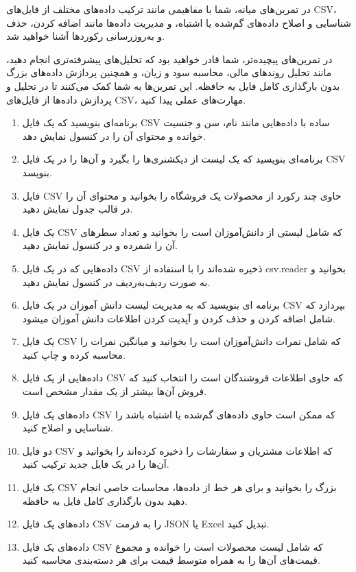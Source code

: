 \documentclass[b5paper,12pt]{article}
\begin{document}
	در تمرین‌های میانه، شما با مفاهیمی مانند ترکیب داده‌های مختلف از فایل‌های CSV، شناسایی و اصلاح داده‌های گم‌شده یا اشتباه، و مدیریت داده‌ها مانند اضافه کردن، حذف و به‌روزرسانی رکوردها آشنا خواهید شد.

	در تمرین‌های پیچیده‌تر، شما قادر خواهید بود که تحلیل‌های پیشرفته‌تری انجام دهید، مانند تحلیل روندهای مالی، محاسبه سود و زیان، و همچنین پردازش داده‌های بزرگ بدون بارگذاری کامل فایل به حافظه. این تمرین‌ها به شما کمک می‌کنند تا در تحلیل و پردازش داده‌ها از فایل‌های CSV، مهارت‌های عملی پیدا کنید.

	\begin{enumerate}
		\item برنامه‌ای بنویسید که یک فایل CSV ساده با داده‌هایی مانند نام، سن و جنسیت خوانده و محتوای آن را در کنسول نمایش دهد.
		\item برنامه‌ای بنویسید که یک لیست از دیکشنری‌ها را بگیرد و آن‌ها را در یک فایل CSV بنویسد.
		\item فایل CSV حاوی چند رکورد از محصولات یک فروشگاه را بخوانید و محتوای آن را در قالب جدول نمایش دهید.
		\item یک فایل CSV که شامل لیستی از دانش‌آموزان است را بخوانید و تعداد سطرهای آن را شمرده و در کنسول نمایش دهید.
		\item داده‌هایی که در یک فایل CSV ذخیره شده‌اند را با استفاده از csv.reader بخوانید و به صورت ردیف‌به‌ردیف در کنسول نمایش دهید.
		\item برنامه ای بنویسید که به مدیریت لیست دانش آموزان در یک فایل CSV بپردازد که شامل اضافه کردن و حذف کردن و آپدیت کردن اطلاعات دانش آموزان میشود.
		\item یک فایل CSV که شامل نمرات دانش‌آموزان است را بخوانید و میانگین نمرات را محاسبه کرده و چاپ کنید.
		\item داده‌هایی از یک فایل CSV که حاوی اطلاعات فروشندگان است را انتخاب کنید که فروش آن‌ها بیشتر از یک مقدار مشخص است.
		\item داده‌های یک فایل CSV که ممکن است حاوی داده‌های گم‌شده یا اشتباه باشد را شناسایی و اصلاح کنید.
		\item دو فایل CSV که اطلاعات مشتریان و سفارشات را ذخیره کرده‌اند را بخوانید و آن‌ها را در یک فایل جدید ترکیب کنید.
		\item یک فایل CSV بزرگ را بخوانید و برای هر خط از داده‌ها، محاسبات خاصی انجام دهید بدون بارگذاری کامل فایل به حافظه.
		\item داده‌های یک فایل CSV را به فرمت JSON یا Excel تبدیل کنید.
		\item داده‌های یک فایل CSV که شامل لیست محصولات است را خوانده و مجموع قیمت‌های آن‌ها را به همراه متوسط قیمت برای هر دسته‌بندی محاسبه کنید.

\end{enumerate}
\end{document}
